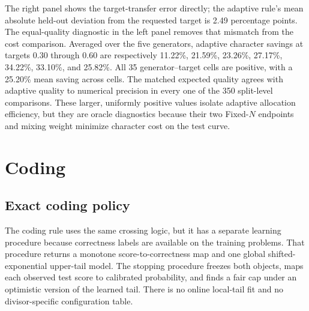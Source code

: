 The right panel shows the target-transfer error directly; the adaptive rule's
mean absolute held-out deviation from the requested target is 2.49 percentage
points.  The equal-quality diagnostic in the left panel removes that mismatch
from the cost comparison.  Averaged over
the five generators, adaptive character savings at targets 0.30 through 0.60
are respectively 11.22\%, 21.59\%, 23.26\%, 27.17\%, 34.22\%, 33.10\%, and
25.82\%.  All 35 generator--target cells are positive, with a 25.20\% mean
saving across cells.  The matched expected quality agrees with adaptive
quality to numerical precision in every one of the 350 split-level
comparisons.  These larger, uniformly positive values isolate adaptive
allocation efficiency, but they are oracle diagnostics because their two
Fixed-$N$ endpoints and mixing weight minimize character cost on the test
curve.


\section{Coding}
\label{sec:coding}

\subsection{Exact coding policy}
\label{sec:coding-algorithm}

The coding rule uses the same crossing logic, but it has a separate learning
procedure because correctness labels are available on the training problems.
That procedure returns a monotone score-to-correctness map and one global
shifted-exponential upper-tail model.  The stopping procedure freezes both
objects, maps each observed test score to calibrated probability, and finds a
fair cap under an optimistic version of the learned tail.  There is no online
local-tail fit and no divisor-specific configuration table.

